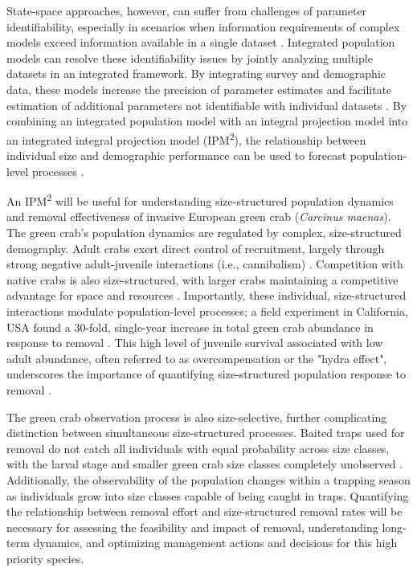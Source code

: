 \documentclass{article}
\begin{document}
State-space approaches, however, can suffer from challenges of parameter identifiability, especially in scenarios when information requirements of complex models exceed information available in a single dataset \parencite{auger2016state}. Integrated population models can resolve these identifiability issues by jointly analyzing multiple datasets in an integrated framework. By integrating survey and demographic data, these models increase the precision of parameter estimates and facilitate estimation of additional parameters not identifiable with individual datasets \parencite{riecke2019integrated, abadi2010assessment}. By combining an integrated population model with an integral projection model into an integrated integral projection model (IPM\textsuperscript{2}), the relationship between individual size and demographic performance can be used to forecast population-level processes \parencite{plard2019ipm}.

An IPM\textsuperscript{2} will be useful for understanding size-structured population dynamics and removal effectiveness of invasive European green crab (\textit{Carcinus maenas}). The green crab’s population dynamics are regulated by complex, size-structured demography. Adult crabs exert direct control of recruitment, largely through strong negative adult-juvenile interactions (i.e., cannibalism) \parencite{grosholz2021stage, romano2017cannibalism}. Competition with native crabs is also size-structured, with larger crabs maintaining a competitive advantage for space and resources \parencite{mcdonald2001competitive, jensen2007biotic}. Importantly, these individual, size-structured interactions modulate population-level processes; a field experiment in California, USA found a 30-fold, single-year increase in total green crab abundance in response to removal \parencite{grosholz2021stage}. This high level of juvenile survival associated with low adult abundance, often referred to as overcompensation or the "hydra effect", underscores the importance of quantifying size-structured population response to removal \parencite{abrams2009does}. 

The green crab observation process is also size-selective, further complicating distinction between simultaneous size-structured processes. Baited traps used for removal do not catch all individuals with equal probability across size classes, with the larval stage and smaller green crab size classes completely unobserved \parencite{jorgensen2009size}. Additionally, the observability of the population changes within a trapping season as individuals grow into size classes capable of being caught in traps. Quantifying the relationship between removal effort and size-structured removal rates will be necessary for assessing the feasibility and impact of removal, understanding long-term dynamics, and optimizing management actions and decisions for this high priority species. 
\end{document}
